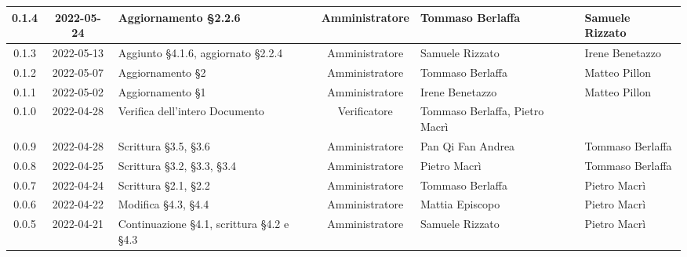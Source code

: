 \begin{center}
\begin{longtable}{ |c|c|p{8em}|c|m{5em}|m{6em}| }
    \hline
	0.1.4 & 2022-05-24 & Aggiornamento §2.2.6 & Amministratore & Tommaso \newline Berlaffa & Samuele \newline Rizzato\\
    \hline
    0.1.3 & 2022-05-13 & Aggiunto §4.1.6, aggiornato §2.2.4 & Amministratore & Samuele \newline Rizzato & Irene \newline Benetazzo\\
    \hline
	0.1.2 & 2022-05-07 & Aggiornamento §2 & Amministratore & Tommaso \newline Berlaffa & Matteo \newline Pillon\\
    \hline
	0.1.1 & 2022-05-02 & Aggiornamento §1 & Amministratore & Irene \newline Benetazzo & Matteo \newline Pillon\\
	\hline
	0.1.0 & 2022-04-28 & Verifica dell'intero Documento & Verificatore & Tommaso Berlaffa, \newline Pietro Macrì & \\
	\hline
	0.0.9 & 2022-04-28 & Scrittura \newline §3.5, §3.6 & Amministratore & Pan Qi Fan \newline Andrea & Tommaso \newline Berlaffa\\
	\hline
	0.0.8 & 2022-04-25 & Scrittura \newline §3.2, §3.3, §3.4 & Amministratore& Pietro \newline Macrì & Tommaso \newline Berlaffa\\
	\hline
	0.0.7 & 2022-04-24 & Scrittura \newline §2.1, §2.2 & Amministratore & Tommaso \newline Berlaffa & Pietro \newline Macrì\\
	\hline
	0.0.6 & 2022-04-22 & Modifica \newline §4.3, §4.4 & Amministratore & Mattia \newline Episcopo & Pietro \newline Macrì\\
	\hline
	0.0.5 & 2022-04-21 & Continuazione §4.1, scrittura §4.2 e §4.3 & Amministratore & Samuele \newline Rizzato & Pietro \newline Macrì\\

\end{longtable}
\end{center}
